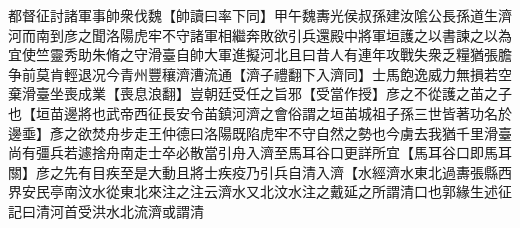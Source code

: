 都督征討諸軍事帥衆伐魏【帥讀曰率下同】甲午魏夀光侯叔孫建汝隂公長孫道生濟河而南到彦之聞洛陽虎牢不守諸軍相繼奔敗欲引兵還殿中將軍垣護之以書諫之以為宜使竺靈秀助朱脩之守滑臺自帥大軍進擬河北且曰昔人有連年攻戰失衆乏糧猶張膽争前莫肯輕退况今青州豐穰濟漕流通【濟子禮翻下入濟同】士馬飽逸威力無損若空棄滑臺坐喪成業【喪息浪翻】豈朝廷受任之旨邪【受當作授】彦之不從護之苖之子也【垣苗邊將也武帝西征長安令苖鎮河濟之會俗謂之垣苖城祖子孫三世皆著功名於邊埀】彥之欲焚舟步走王仲德曰洛陽既陷虎牢不守自然之勢也今虜去我猶千里滑臺尚有彊兵若遽捨舟南走士卒必散當引舟入濟至馬耳谷口更詳所宜【馬耳谷口即馬耳關】彦之先有目疾至是大動且將士疾疫乃引兵自清入濟【水經濟水東北過夀張縣西界安民亭南汶水從東北來注之注云濟水又北汶水注之戴延之所謂清口也郭緣生述征記曰清河首受洪水北流濟或謂清
